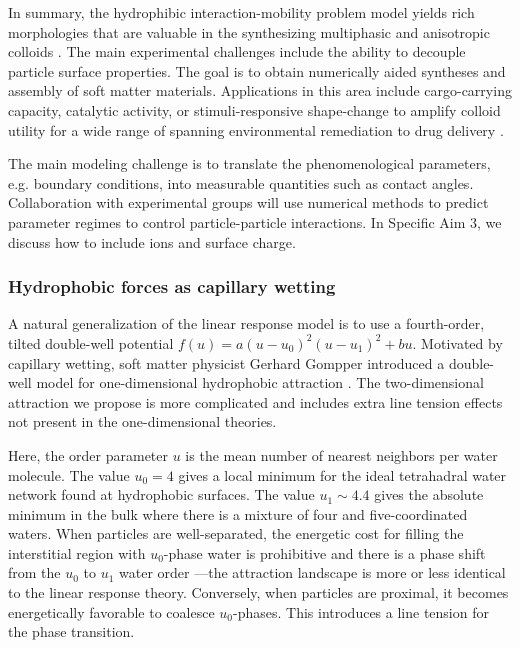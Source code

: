 In summary, the hydrophibic interaction-mobility problem model yields
rich morphologies that are valuable in the synthesizing multiphasic and
anisotropic colloids \cite{Bradley2016,Mallory2017,Bradley2017}.
The main experimental challenges include the ability to
decouple particle surface properties.
The goal is to obtain numerically aided 
syntheses and assembly of soft matter materials.
Applications in this area include cargo-carrying capacity, 
catalytic activity, or stimuli-responsive shape-change to amplify colloid
utility for a wide range of  spanning environmental remediation to drug
delivery \cite{McBr21, HaBr20}.







The main modeling challenge is to translate the phenomenological
parameters, e.g. boundary conditions, into measurable quantities
such as contact angles. Collaboration with experimental groups will
use numerical methods to predict parameter regimes 
to control particle-particle interactions. In Specific Aim 3, we
discuss how to include ions and surface charge. 

\subsubsection{Hydrophobic forces as capillary wetting}
A natural generalization of the linear response model is 
to use a fourth-order, tilted double-well potential
$f(u) = a(u-u_0)^2(u-u_1)^2 + bu$.
Motivated by capillary wetting, soft matter physicist Gerhard Gompper 
introduced a double-well model for one-dimensional hydrophobic attraction
\cite{GoHaKo94}. The two-dimensional attraction we propose
is more complicated and includes extra line tension effects
not present in the one-dimensional theories. 

Here, the order parameter $u$ is the mean number of nearest
neighbors per water molecule.
The value $u_0 = 4$ gives a local minimum for the ideal
tetrahadral water network found at hydrophobic surfaces.  
The value $u_1 \sim 4.4$ gives the absolute minimum
in the bulk where there is a mixture of four and five-coordinated
waters.
When particles are well-separated, the energetic cost for filling
the interstitial region with $u_0$-phase water is prohibitive
and there is a phase shift from the $u_0$ to $u_1$ water order
---the attraction landscape is more
or less identical to the linear response theory. Conversely, when
particles are proximal, it becomes energetically favorable
to coalesce $u_0$-phases. This introduces a line tension
for the phase transition.

